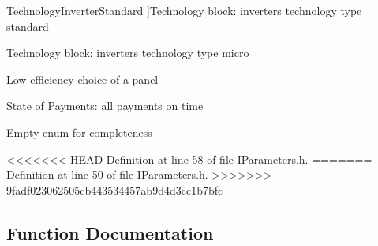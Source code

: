 \begin{Desc}
\begin{description}
{\hypertarget{namespacesolar__core_aa1147341e5ef7a40d68d1bd68e149362a1a190aa7a38d2e8a842cd07e17dfac09}{}Technology\+Inverter\+Standard\label{namespacesolar__core_aa1147341e5ef7a40d68d1bd68e149362a1a190aa7a38d2e8a842cd07e17dfac09}
}]Technology block\+: inverters technology type standard \item[{\em 
\hypertarget{namespacesolar__core_aa1147341e5ef7a40d68d1bd68e149362acff31f4237035a33c80d603fd67f6abd}{}Technology\+Inverter\+Micro\label{namespacesolar__core_aa1147341e5ef7a40d68d1bd68e149362acff31f4237035a33c80d603fd67f6abd}
}]Technology block\+: inverters technology type micro \item[{\em 
=======
}]Low efficiency choice of a panel \item[{\em 
\hypertarget{namespacesolar__core_aa1147341e5ef7a40d68d1bd68e149362a7863d48ef49981916e8a483f2171b306}{}Payments\+On\+Time\label{namespacesolar__core_aa1147341e5ef7a40d68d1bd68e149362a7863d48ef49981916e8a483f2171b306}
}]State of Payments\+: all payments on time \item[{\em 
>>>>>>> 9fadf023062505cb443534457ab9d4d3cc1b7bfc
\hypertarget{namespacesolar__core_aa1147341e5ef7a40d68d1bd68e149362a6adf97f83acf6453d4a6a4b1070f3754}{}None\label{namespacesolar__core_aa1147341e5ef7a40d68d1bd68e149362a6adf97f83acf6453d4a6a4b1070f3754}
}]Empty enum for completeness \end{description}
\end{Desc}


<<<<<<< HEAD
Definition at line 58 of file I\+Parameters.\+h.
=======
Definition at line 50 of file I\+Parameters.\+h.
>>>>>>> 9fadf023062505cb443534457ab9d4d3cc1b7bfc



\subsection{Function Documentation}
\hypertarget{namespacesolar__core_aa8fea9dac434e9830aad9dea4f5ebf53}{}
